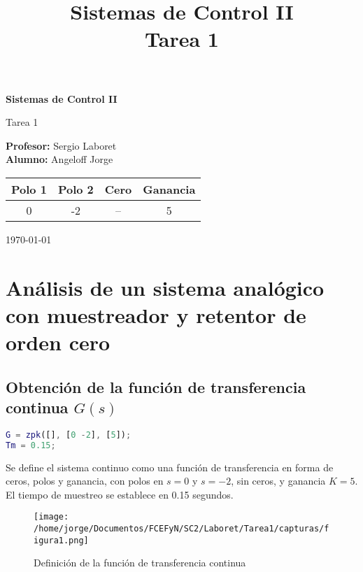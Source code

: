 \documentclass[11pt]{article}
\title{\Huge Sistemas de Control II \\[0.4cm] \Large Tarea 1}
\date{}
\begin{document}
\begin{titlepage}
    \centering
    \vspace*{2cm}
    {\Huge\bfseries Sistemas de Control II \par}
    \vspace{0.5cm}
    {\Large Tarea 1 \par}
    \vspace{2cm}
    \begin{flushleft}
        \large
        \textbf{Profesor:} Sergio Laboret\\[0.3cm]
        \textbf{Alumno:} Angeloff Jorge
    \end{flushleft}
    \vspace{2cm}
    \begin{center}
        \begin{tabular}{|c|c|c|c|}
            \hline
            Polo 1 & Polo 2 & Cero & Ganancia \\
            \hline
            0 & -2 & -- & 5 \\
            \hline
        \end{tabular}
    \end{center}
    \vfill
    {\large \today}
\end{titlepage}

\section{Análisis de un sistema analógico con muestreador y retentor de orden cero}

\subsection{Obtención de la función de transferencia continua \(G(s)\)}
\begin{lstlisting}[language=Matlab]
G = zpk([], [0 -2], [5]);
Tm = 0.15;
\end{lstlisting}

Se define el sistema continuo como una función de transferencia en forma de ceros, polos y ganancia, con polos en \(s = 0\) y \(s = -2\), sin ceros, y ganancia \(K = 5\). El tiempo de muestreo se establece en 0.15 segundos.

\begin{figure}[h!]
    \centering
    \texttt{[image: /home/jorge/Documentos/FCEFyN/SC2/Laboret/Tarea1/capturas/figura1.png]}
    \caption{Definición de la función de transferencia continua}
\end{figure}
\end{document}
